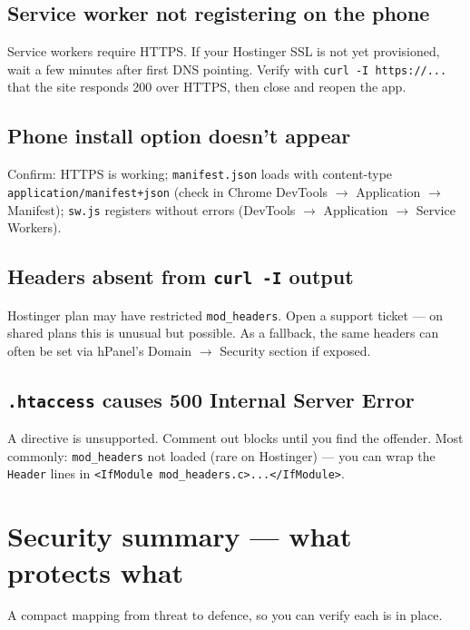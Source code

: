\documentclass[11pt,a4paper]{article}
\begin{document}
\subsection*{Service worker not registering on the phone}
Service workers require HTTPS. If your Hostinger SSL is not yet provisioned, wait a few minutes after first DNS pointing. Verify with \texttt{curl -I https://...} that the site responds 200 over HTTPS, then close and reopen the app.

\subsection*{Phone install option doesn't appear}
Confirm: HTTPS is working; \texttt{manifest.json} loads with content-type \texttt{application/manifest+json} (check in Chrome DevTools $\rightarrow$ Application $\rightarrow$ Manifest); \texttt{sw.js} registers without errors (DevTools $\rightarrow$ Application $\rightarrow$ Service Workers).

\subsection*{Headers absent from \texttt{curl -I} output}
Hostinger plan may have restricted \texttt{mod\_headers}. Open a support ticket --- on shared plans this is unusual but possible. As a fallback, the same headers can often be set via hPanel's Domain $\rightarrow$ Security section if exposed.

\subsection*{\texttt{.htaccess} causes 500 Internal Server Error}
A directive is unsupported. Comment out blocks until you find the offender. Most commonly: \texttt{mod\_headers} not loaded (rare on Hostinger) --- you can wrap the \texttt{Header} lines in \texttt{<IfModule mod\_headers.c>...</IfModule>}.

\section{Security summary --- what protects what}

A compact mapping from threat to defence, so you can verify each is in place.
\end{document}
